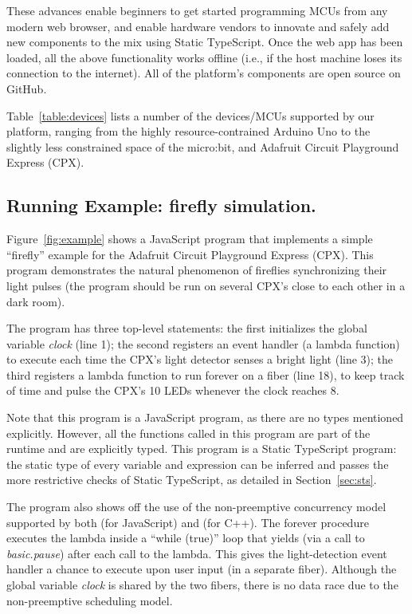These advances enable beginners to get started programming MCUs from
any modern web browser, and enable hardware vendors to innovate and safely add new
components to the mix using Static TypeScript.
Once the web app has been loaded, all the above functionality works offline
(i.e., if the host machine loses its connection
to the internet). All of the platform's components are open source on GitHub.

Table~\ref{table:devices} lists a number of the devices/MCUs supported by our platform,
ranging from the highly resource-contrained Arduino Uno to the slightly less constrained space of
the micro:bit, and Adafruit Circuit Playground Express (CPX).

\subsection{Running Example: firefly simulation.}

Figure~\ref{fig:example} shows a JavaScript
program that implements a simple ``firefly'' example
for the Adafruit Circuit Playground Express (CPX).
This program demonstrates the natural phenomenon
of fireflies synchronizing their light pulses (the program should be
run on several CPX's close to each other in a dark room).

The program has three top-level statements:
the first initializes the global variable \emph{clock} (line 1); the
second registers an event handler (a lambda function) to execute
each time the CPX's light detector senses a bright light (line 3); the
third registers a lambda function to run forever on a fiber (line 18),
to keep track of time and pulse the CPX's 10 LEDs whenever the
clock reaches 8.

Note that this program is a JavaScript program, as there are no
types mentioned explicitly. However, all the functions called in
this program are part of the runtime and are explicitly
typed. This program is a Static TypeScript program:
the static type of every variable and expression
can be inferred and passes the more restrictive checks
of Static TypeScript, as detailed in Section~\ref{sec:sts}.

The program also shows off the use of the non-preemptive concurrency
model supported by both \MC (for JavaScript) and \CO (for C++).
The forever procedure executes the lambda inside a ``while (true)''
loop that yields (via a call to \emph{basic.pause}) after each call to the lambda.
This gives the light-detection event handler a chance to execute
upon user input (in a separate fiber). Although the global variable \emph{clock} is
shared by the two fibers, there is no data race due to the non-preemptive
scheduling model.

